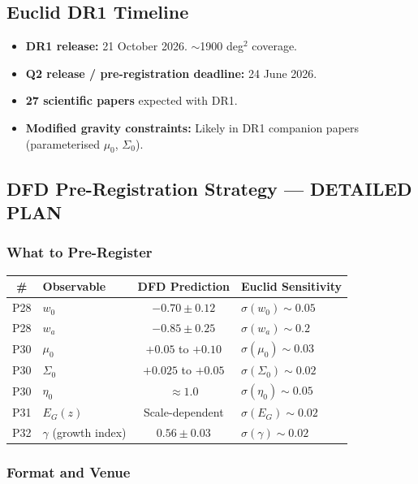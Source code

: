 \documentclass[11pt,a4paper]{article}
\begin{document}
\subsection{Euclid DR1 Timeline}

\begin{itemize}
\item \textbf{DR1 release:} 21 October 2026. $\sim$1900 deg$^2$ coverage.
\item \textbf{Q2 release / pre-registration deadline:} 24 June 2026.
\item \textbf{27 scientific papers} expected with DR1.
\item \textbf{Modified gravity constraints:} Likely in DR1 companion papers (parameterised $\mu_0$, $\Sigma_0$).
\end{itemize}

\subsection{DFD Pre-Registration Strategy --- DETAILED PLAN}

\subsubsection{What to Pre-Register}

\begin{center}
\begin{longtable}{clcl}
\toprule
\textbf{\#} & \textbf{Observable} & \textbf{DFD Prediction} & \textbf{Euclid Sensitivity} \\
\midrule
\endfirsthead
P28 & $w_0$ & $-0.70 \pm 0.12$ & $\sigma(w_0) \sim 0.05$ \\
P28 & $w_a$ & $-0.85 \pm 0.25$ & $\sigma(w_a) \sim 0.2$ \\
P30 & $\mu_0$ & $+0.05$ to $+0.10$ & $\sigma(\mu_0) \sim 0.03$ \\
P30 & $\Sigma_0$ & $+0.025$ to $+0.05$ & $\sigma(\Sigma_0) \sim 0.02$ \\
P30 & $\eta_0$ & $\approx 1.0$ & $\sigma(\eta_0) \sim 0.05$ \\
P31 & $E_G(z)$ & Scale-dependent & $\sigma(E_G) \sim 0.02$ \\
P32 & $\gamma$ (growth index) & $0.56 \pm 0.03$ & $\sigma(\gamma) \sim 0.02$ \\
\bottomrule
\end{longtable}
\end{center}

\subsubsection{Format and Venue}
\end{document}
